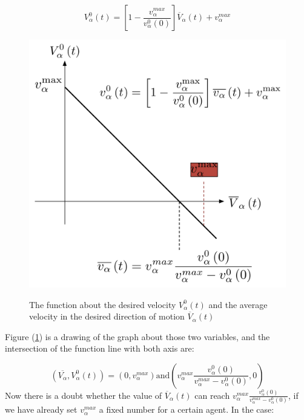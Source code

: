 \begin{equation}\label{vv}
    V_{\alpha}^{0}(t) = \left[ 1 - \frac{v_{\alpha}^{max}}{v_{\alpha}^{0}(0)}\right]\overline{V}_{\alpha} \left( t \right) + v_{\alpha}^{max}
\end{equation}

\begin{figure}[ht]
\centering
{\includegraphics[scale=0.35]{Figures/impatience.pdf}} 
\caption{\small{The function about the desired velocity $ V_{\alpha}^{0}(t) $ 
and the average velocity in the desired direction of motion $ \overline{V}_{\alpha} \left( t \right) $}}
\label{impatience}
\end{figure}

Figure (\ref{impatience}) is a drawing of the graph about those two variables, and the intersection
 of the function line with both axis are:

\begin{equation}
\left( 
	\overline{V_{\alpha}} , V_{\alpha}^{0} \left( t \right)
\right)
=
\left( 
	0 
		, 
	v_{\alpha}^{max} 
\right) 
\text{and} 
\left(
	v_{\alpha}^{max} 
		\frac{v_{\alpha}^{0} \left( 0 \right) }{v_{\alpha}^{max}-v_{\alpha}^{0} \left(0 \right)} 
	, 0 
\right) 
\end{equation}
Now there is a doubt whether the value of $ \overline{V}_{\alpha} \left( t \right) $ can reach $ v_{\alpha}^{max}\frac{v_{\alpha}^{0}(0)}{v_{\alpha}^{max}-v_{\alpha}^{0}(0)} $, if we have already 
set $ v_{\alpha}^{max} $ a fixed number for a certain agent. In the case:

